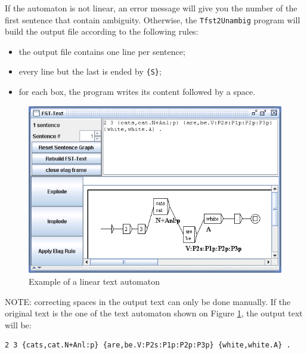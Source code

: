 \bigskip
\noindent If the automaton is not linear, an error message will give you the number of
the first sentence that contain ambiguity. Otherwise, the \verb+Tfst2Unambig+ program
will build the output file according to the following rules:

\begin{itemize}
  \item the output file contains one line per sentence;
  \item every line but the last is ended by \verb+{S}+;
  \item for each box, the program writes its content followed by a space.
\end{itemize}

\begin{figure}[!ht]
\begin{center}
\includegraphics[width=12cm]{resources/img/fig7-26.png}
\caption{Example of a linear text automaton\label{fig-linear-automaton}}
\end{center}
\end{figure}

\bigskip
\noindent NOTE: correcting spaces in the output text can only be done manually. If the
original text is the one of the text automaton shown on Figure \ref{fig-linear-automaton},
the output text will be:

\begin{verbatim}
2 3 {cats,cat.N+Anl:p} {are,be.V:P2s:P1p:P2p:P3p} {white,white.A} .
\end{verbatim}


